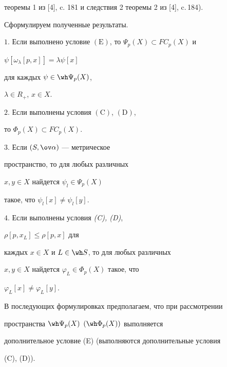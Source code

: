 теоремы 1 из [4], c. 181 и следствия 2 теоремы 2 из [4], c.\,184).








Сформулируем полученные результаты.





\begin{lem}


$1.$ Если выполнено условие $(\mathrm E)$, то $\Psi_{p}(X) \subset FC_{p}(X)$ и


$\psi[\omega_{\lambda}[p,x]] = \lambda\psi[x]$


для каждых $\psi \in \wh \Psi_{p}(X)$,


$\lambda \in R_{+}$, $x \in X$. 





$2.$ Если выполнены условия $(\mathrm C)$, $(\mathrm D)$,


то $\Phi_{p}(X) \subset FC_{p}(X)$. 





$3.$ Если $(S,\ov \alpha)$ --- метрическое


пространство, то для любых различных


$x, y \in X$ найдется $\psi _{l} \in \Psi _{p}(X)$


такое, что $\psi _{l}[x] \neq \psi _{l}[y]$. 





$4.$ Если выполнены условия {\em (C), (D)},


$\rho [p,x_{L}] \leq  \rho [p,x]$ для


каждых $x \in X$ и $L \in \wh S$, то для любых различных


$x, y \in X$ найдется $\varphi _{L} \in \Phi _{p}(X)$ такое, что


$\varphi _{L}[x] \neq \varphi _{L}[y]$.


\end{lem}





В последующих формулировках предполагаем, что при рассмотрении


пространства  $\wh \Psi_{p}(X)$ $(\wh \Phi_{p}(X))$ выполняется


дополнительное условие (E) (выполняются дополнительные условия


(C), (D)).





